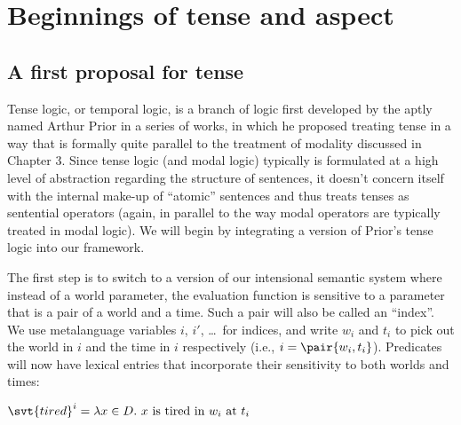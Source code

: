 \newcommand{\pres}{\textsc{pres}\xspace}
\newcommand{\past}{\textsc{past}\xspace}
\newcommand{\pfv}{\textsc{pfv}\xspace}
\newcommand{\prog}{\textsc{prog}\xspace}

\chapter{Beginnings of tense and aspect}\label{cha:tense-aspect}

\minitoc

\section{A first proposal for tense}
\label{sec:first-proposal}

%
Tense logic, or temporal logic, is a branch of logic first developed by the
aptly named Arthur Prior in a series of works, in which he proposed treating
tense in a way that is formally quite parallel to the treatment of modality
discussed in Chapter 3. Since tense logic (and modal logic) typically is
formulated at a high level of abstraction regarding the structure of sentences,
it doesn’t concern itself with the internal make-up of ``atomic'' sentences and
thus treats tenses as sentential operators (again, in parallel to the way modal
operators are typically treated in modal logic). We will begin by integrating a
version of Prior’s tense logic into our framework.

%
The first step is to switch to a version of our intensional semantic system
where instead of a world parameter, the evaluation function is sensitive to a
parameter that is a pair of a world and a time. Such a pair will also be called
an ``index''. We use metalanguage variables $i$, $i'$, \dots\ for indices, and
write $w_{i}$ and $t_{i}$ to pick out the world in $i$ and the time in $i$
respectively (i.e., $i = \pair{w_{i},t_{i}}$). Predicates will now have lexical
entries that incorporate their sensitivity to both worlds and times:

\ex $\svt{tired}^{i} = \lambda x\in D.\ x\ \text{is tired
  in}\ w_{i}\ \text{at}\ t_{i}$ \xe

